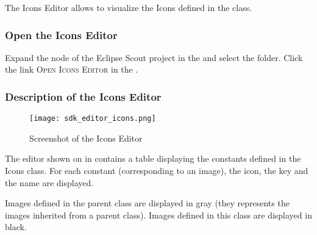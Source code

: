 %

The Icons Editor allows to visualize the Icons defined in the  class. 

\subsubsection*{Open the Icons Editor}

Expand the  node of the Eclipse Scout project in the \scoutExplorerView and select the  folder. Click the link \textsc{Open Icons Editor} in the \scoutPropView. 

\subsubsection*{Description of the Icons Editor}

\begin{figure}
\texttt{[image: sdk\_editor\_icons.png]}
\caption{Screenshot of the Icons Editor}
\end{figure}

The editor shown on in  contains a table displaying the constants defined in the Icons class. For each constant (corresponding to an image), the icon, the key and the name are displayed.

Images defined in the parent class are displayed in gray (they represents the images inherited from a parent class). Images defined in this class are displayed in black.


